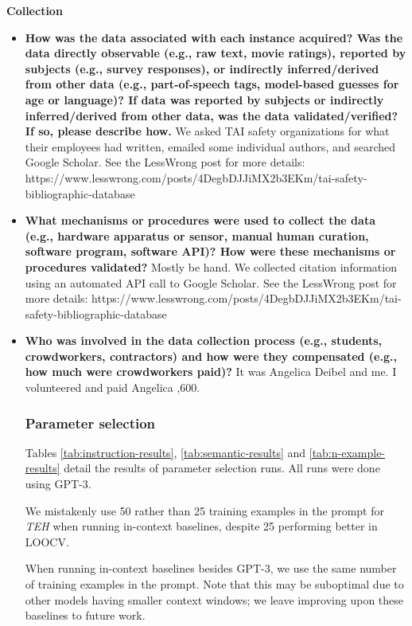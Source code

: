 \documentclass{article}
\begin{document}
\textbf{Collection}

\begin{itemize}
    \item \textbf{How was the data associated with each instance acquired? Was the data directly observable (e.g., raw text, movie ratings), reported by subjects (e.g., survey responses), or indirectly inferred/derived from other data (e.g., part-of-speech tags, model-based guesses for age or language)? If data was reported by subjects or indirectly inferred/derived from other data, was the data validated/verified? If so, please describe how.} We asked TAI safety organizations for what their employees had written, emailed some individual authors, and searched Google Scholar. See the LessWrong post for more details: https://www.lesswrong.com/posts/4DegbDJJiMX2b3EKm/tai-safety-bibliographic-database
    \item \textbf{What mechanisms or procedures were used to collect the data (e.g., hardware apparatus or sensor, manual human curation, software program, software API)? How were these mechanisms or procedures validated?} Mostly be hand.  We collected citation information using an automated API call to Google Scholar. See the LessWrong post for more details: https://www.lesswrong.com/posts/4DegbDJJiMX2b3EKm/tai-safety-bibliographic-database
    \item \textbf{Who was involved in the data collection process (e.g., students, crowdworkers, contractors) and how were they compensated (e.g., how much were crowdworkers paid)?} It was Angelica Deibel and me.  I volunteered and paid Angelica \2,600.

\subsubsection{Parameter selection}
Tables \ref{tab:instruction-results}, \ref{tab:semantic-results} and \ref{tab:n-example-results} detail the results of parameter selection runs. All runs were done using GPT-3.

We mistakenly use 50 rather than 25 training examples in the prompt for \textit{TEH} when running in-context baselines, despite 25 performing better in LOOCV.

When running in-context baselines besides GPT-3, we use the same number of training examples in the prompt. Note that this may be suboptimal due to other models having smaller context windows; we leave improving upon these baselines to future work.


\end{itemize}
\end{document}
